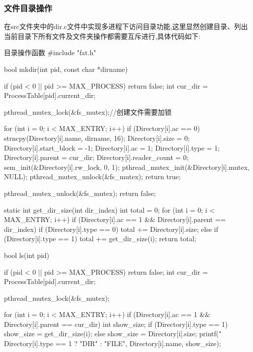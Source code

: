 \subsubsection{文件目录操作}
在src文件夹中的dir.c文件中实现多进程下访问目录功能,这里显然创建目录、列出当前目录下所有文件及文件夹操作都需要互斥进行,具体代码如下:
\begin{ccode}{目录操作函数}
#include "fat.h"

bool mkdir(int pid, const char *dirname)
{
    if (pid < 0 || pid >= MAX_PROCESS) return false;
    int cur_dir = ProcessTable[pid].current_dir;

    pthread_mutex_lock(&fs_mutex);//创建文件需要加锁

    for (int i = 0; i < MAX_ENTRY; i++) {
        if (Directory[i].ac == 0) {
            strncpy(Directory[i].name, dirname, 16);
            Directory[i].size = 0;
            Directory[i].start_block = -1;
            Directory[i].ac = 1;
            Directory[i].type = 1;
            Directory[i].parent = cur_dir;
            Directory[i].reader_count = 0;
            sem_init(&Directory[i].rw_lock, 0, 1);
            pthread_mutex_init(&Directory[i].mutex, NULL);
            pthread_mutex_unlock(&fs_mutex);
            return true;
        }
    }

    pthread_mutex_unlock(&fs_mutex);
    return false;
}

static int get_dir_size(int dir_index)
{
    int total = 0;
    for (int i = 0; i < MAX_ENTRY; i++) {
        if (Directory[i].ac == 1 && Directory[i].parent == dir_index) {
            if (Directory[i].type == 0) {
                total += Directory[i].size;
            } else if (Directory[i].type == 1) {
                total += get_dir_size(i);
            }
        }
    }
    return total;
}

bool ls(int pid)
{
    if (pid < 0 || pid >= MAX_PROCESS) return false;
    int cur_dir = ProcessTable[pid].current_dir;

    pthread_mutex_lock(&fs_mutex);

    for (int i = 0; i < MAX_ENTRY; i++) {
        if (Directory[i].ac == 1 && Directory[i].parent == cur_dir) {
            int show_size;
            if (Directory[i].type == 1) {
                show_size = get_dir_size(i);
            } else {
                show_size = Directory[i].size;
            }
            printf("%
                   Directory[i].type == 1 ? "DIR" : "FILE",
                   Directory[i].name,
                   show_size);
        }
    }

}
\end{ccode}
